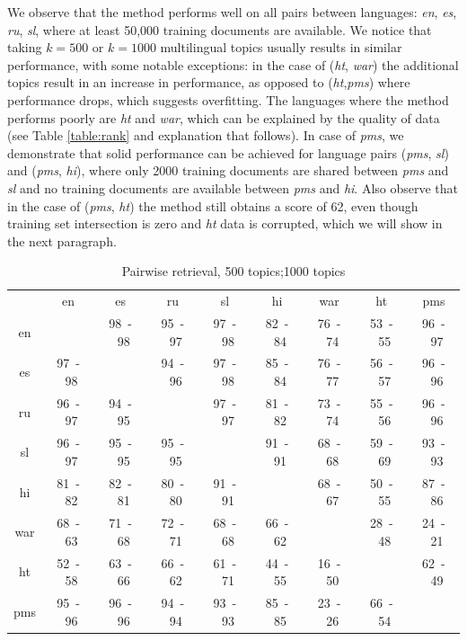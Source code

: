 \documentclass[twoside,11pt]{article}
\begin{document}
{We observe that the method performs well on all pairs between languages: \emph{en}, \emph{es}, \emph{ru}, \emph{sl}, where at least 50,000 training documents are available. We notice that taking $k = 500$ or $k = 1000$ multilingual topics usually results in similar performance, with some notable exceptions: in the case of (\emph{ht}, \emph{war}) the additional topics result in an increase in performance, as opposed to (\emph{ht},\emph{pms}) where performance drops, which suggests overfitting. The languages where the method performs poorly are \emph{ht} and \emph{war}, which can be explained by the quality of data (see Table \ref{table:rank} and explanation that follows). In case of \emph{pms}, we demonstrate that solid performance can be achieved for language pairs (\emph{pms}, \emph{sl}) and (\emph{pms}, \emph{hi}), where only 2000 training documents are shared between \emph{pms} and \emph{sl} and no training documents are available between \emph{pms} and \emph{hi}. Also observe that in the case of (\emph{pms}, \emph{ht}) the method still obtains a score of 62, even though training set intersection is zero and \emph{ht} data is corrupted, which we will show in the next paragraph.
{
\renewcommand\tabcolsep{3pt}
\begin{table}[h!]
\caption{Pairwise retrieval, 500 topics;1000 topics}\label{table:retrieval}
\begin{center}
\begin{tabular}{|c|c|c|c|c|c|c|c|c|}
\cline{1-9}
&	en&	es&	ru&	sl&	hi&	war&	ht&	pms\\\cline{1-9}
en&	    &	98~-~98&	95~-~97&	97~-~98&	82~-~84&	76~-~74&	53~-~55&	 96~-~97\\
\cline{1-9}
es&	97~-~98&	&	94~-~96&	97~-~98&	85~-~84&	76~-~77&	56~-~57&	96~-~96\\
\cline{1-9}
ru&	96~-~97&	94~-~95&	&	97~-~97&	81~-~82&	73~-~74&	55~-~56&	96~-~96\\
\cline{1-9}
sl&	96~-~97&	95~-~95&	95~-~95&	&	91~-~91&	68~-~68&	59~-~69&	93~-~93\\
\cline{1-9}
hi&	81~-~82&	82~-~81&	80~-~80&	91~-~91&	&	68~-~67&	50~-~55&	87~-~86\\
\cline{1-9}
war&	68~-~63&	71~-~68&	72~-~71&	68~-~68&	66~-~62&	&	28~-~48&	 24~-~21\\
\cline{1-9}
ht&	52~-~58&	63~-~66&	66~-~62&	61~-~71&	44~-~55&	16~-~50&	&	62~-~49\\
\cline{1-9}
pms&	95~-~96&	96~-~96&	94~-~94&	93~-~93&	85~-~85&	23~-~26&	66~-~54&	 \\
\cline{1-9}
\end{tabular}
\end{center}
\end{table}
}

}
\end{document}
